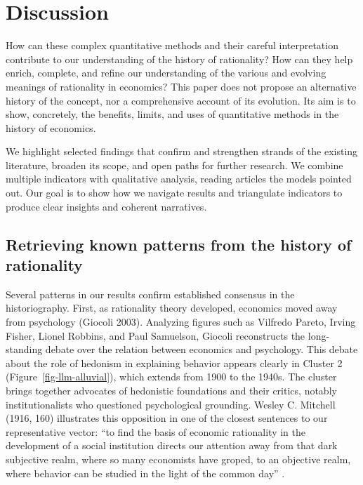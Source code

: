\documentclass[
]{interact}
\begin{document}
\section{\texorpdfstring{\textbf{Discussion}}{Discussion}}\label{discussion}

How can these complex quantitative methods and their careful
interpretation contribute to our understanding of the history of
rationality? How can they help enrich, complete, and refine our
understanding of the various and evolving meanings of rationality in
economics? This paper does not propose an alternative history of the
concept, nor a comprehensive account of its evolution. Its aim is to
show, concretely, the benefits, limits, and uses of quantitative methods
in the history of economics.

We highlight selected findings that confirm and strengthen strands of
the existing literature, broaden its scope, and open paths for further
research. We combine multiple indicators with qualitative analysis,
reading articles the models pointed out. Our goal is to show how we
navigate results and triangulate indicators to produce clear insights
and coherent narratives.

\subsection{Retrieving known patterns from the history of
rationality}\label{retrieving-known-patterns-from-the-history-of-rationality}

Several patterns in our results confirm established consensus in the
historiography. First, as rationality theory developed, economics moved
away from psychology (Giocoli 2003). Analyzing figures such as Vilfredo
Pareto, Irving Fisher, Lionel Robbins, and Paul Samuelson, Giocoli
reconstructs the long-standing debate over the relation between
economics and psychology. This debate about the role of hedonism in
explaining behavior appears clearly in Cluster 2
(Figure~\ref{fig-llm-alluvial}), which extends from 1900 to the 1940s.
The cluster brings together advocates of hedonistic foundations and
their critics, notably institutionalists who questioned psychological
grounding. Wesley C. Mitchell (1916, 160) illustrates this opposition in
one of the closest sentences to our representative vector: ``to find the
basis of economic rationality in the development of a social institution
directs our attention away from that dark subjective realm, where so
many economists have groped, to an objective realm, where behavior can
be studied in the light of the common day'' .
\end{document}
